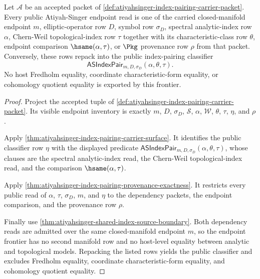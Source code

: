 \begin{theorem}
\label{thm:atiyahsinger-root-endpoint-exactness-frontier}
Let $\mathcal{A}$ be an accepted packet of \autoref{def:atiyahsinger-index-pairing-carrier-packet}. Every public Atiyah-Singer endpoint read is one of the carried closed-manifold endpoint $m$, elliptic-operator row $D$, symbol row $\sigma_D$, spectral analytic-index row $\alpha$, Chern-Weil topological-index row $\tau$ together with its characteristic-class row $\theta$, endpoint comparison $\hsame(\alpha,\tau)$, or $\Pkg$ provenance row $\rho$ from that packet. Conversely, these rows repack into the public index-pairing classifier
$$
\mathsf{ASIndexPair}_{m,D,\sigma_D}(\alpha,\theta,\tau).
$$
No host Fredholm equality, coordinate characteristic-form equality, or cohomology quotient equality is exported by this frontier.
\end{theorem}
\begin{proof}
Project the accepted tuple of \autoref{def:atiyahsinger-index-pairing-carrier-packet}. Its visible endpoint inventory is exactly $m$, $D$, $\sigma_D$, $\mathcal{S}$, $\alpha$, $\mathcal{W}$, $\theta$, $\tau$, $\eta$, and $\rho$.

Apply \autoref{thm:atiyahsinger-index-pairing-carrier-surface}. It identifies the public classifier row $\eta$ with the displayed predicate $\mathsf{ASIndexPair}_{m,D,\sigma_D}(\alpha,\theta,\tau)$, whose clauses are the spectral analytic-index read, the Chern-Weil topological-index read, and the comparison $\hsame(\alpha,\tau)$.

Apply \autoref{thm:atiyahsinger-index-pairing-provenance-exactness}. It restricts every public read of $\alpha$, $\tau$, $\sigma_D$, $m$, and $\eta$ to the dependency packets, the endpoint comparison, and the provenance row $\rho$.

Finally use \autoref{thm:atiyahsinger-shared-index-source-boundary}. Both dependency reads are admitted over the same closed-manifold endpoint $m$, so the endpoint frontier has no second manifold row and no host-level equality between analytic and topological models. Repacking the listed rows yields the public classifier and excludes Fredholm equality, coordinate characteristic-form equality, and cohomology quotient equality.
\end{proof}

